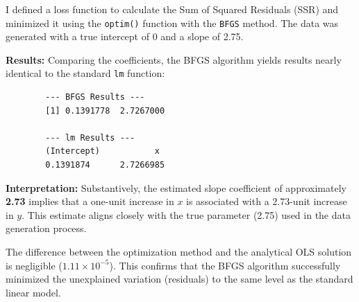 \documentclass[12pt,letterpaper]{article}
\begin{document}
	I defined a loss function to calculate the Sum of Squared Residuals (SSR) and minimized it using the \texttt{optim()} function with the \texttt{BFGS} method. The data was generated with a true intercept of 0 and a slope of 2.75.
	
	
	
	\vspace{0.3cm}
	\noindent \textbf{Results:}
	Comparing the coefficients, the BFGS algorithm yields results nearly identical to the standard \texttt{lm} function:
	
	\begin{verbatim}
		--- BFGS Results ---
		[1] 0.1391778  2.7267000
		
		--- lm Results ---
		(Intercept)           x 
		0.1391874      2.7266985 
	\end{verbatim}
	
	\noindent \textbf{Interpretation:}
	Substantively, the estimated slope coefficient of approximately \textbf{2.73} implies that a one-unit increase in $x$ is associated with a 2.73-unit increase in $y$. This estimate aligns closely with the true parameter (2.75) used in the data generation process.
	
	The difference between the optimization method and the analytical OLS solution is negligible ($1.11 \times 10^{-5}$). This confirms that the BFGS algorithm successfully minimized the unexplained variation (residuals) to the same level as the standard linear model.
	
\end{document}
